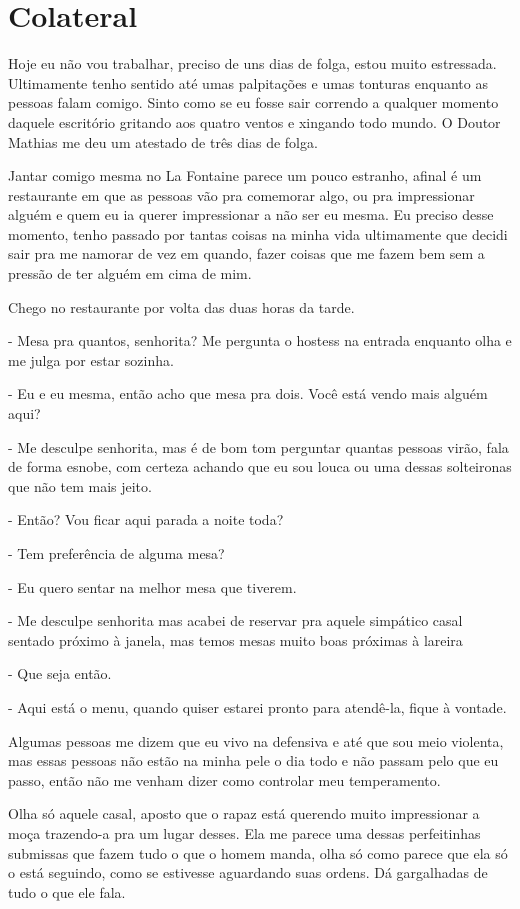\chapter{Colateral}
Hoje eu não vou trabalhar, preciso de uns dias de folga, estou muito estressada. Ultimamente tenho sentido até umas palpitações e umas tonturas enquanto as pessoas falam comigo. Sinto como se eu fosse sair correndo a qualquer momento daquele escritório gritando aos quatro ventos e xingando todo mundo. O Doutor Mathias me deu um atestado de três dias de folga.  

Jantar comigo mesma no La Fontaine parece um pouco estranho, afinal é um restaurante em que as pessoas vão pra comemorar algo, ou pra impressionar alguém e quem eu ia querer impressionar a não ser eu mesma. Eu preciso desse momento, tenho passado por tantas coisas na minha vida ultimamente que decidi sair pra me namorar de vez em quando, fazer coisas que me fazem bem sem a pressão de ter alguém em cima de mim.

Chego no restaurante por volta das duas horas da tarde.

- Mesa pra quantos, senhorita? Me pergunta o hostess na entrada enquanto olha e me julga por estar sozinha.

- Eu e eu mesma, então acho que mesa pra dois. Você está vendo mais alguém aqui?

- Me desculpe senhorita, mas é de bom tom perguntar quantas pessoas virão, fala de forma esnobe, com certeza achando que eu sou louca ou uma dessas solteironas que não tem mais jeito.

- Então? Vou ficar aqui parada a noite toda?

- Tem preferência de alguma mesa?

- Eu quero sentar na melhor mesa que tiverem.

- Me desculpe senhorita mas acabei de reservar pra aquele simpático casal sentado próximo à janela, mas temos mesas muito boas próximas à lareira

- Que seja então.

- Aqui está o menu, quando quiser estarei pronto para atendê-la, fique à vontade.

Algumas pessoas me dizem que eu vivo na defensiva e até que sou meio violenta, mas essas pessoas não estão na minha pele o dia todo e não passam pelo que eu passo, então não me venham dizer como controlar meu temperamento.

Olha só aquele casal, aposto que o rapaz está querendo muito impressionar a moça trazendo-a pra um lugar desses. Ela me parece uma dessas perfeitinhas submissas que fazem tudo o que o homem manda, olha só como parece que ela só o está seguindo, como se estivesse aguardando suas ordens. Dá gargalhadas de tudo o que ele fala.


